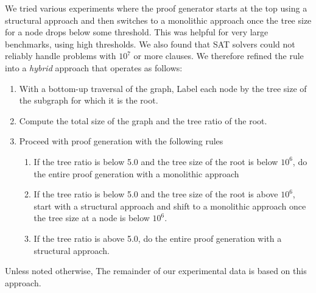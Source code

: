 \documentclass[twoside,11pt]{article}
\begin{document}
We tried various experiments where the proof generator starts at the
top using a structural approach and then switches to a monolithic
approach once the tree size for a node drops below some threshold.
This was helpful for very large benchmarks, using high thresholds.
We also found that SAT solvers could not reliably handle problems with $10^7$ or more clauses.
We therefore refined the rule into a \emph{hybrid} approach that operates as follows:
\begin{enumerate}
\item With a bottom-up traversal of the graph, Label each node by the tree size of the subgraph for which it is the root.
\item Compute the total size of the graph and the tree ratio of the root.
\item Proceed with proof generation with the following rules
  \begin{enumerate}
  \item If the tree ratio is below 5.0 and the tree size of the root is below $10^6$, do the entire proof generation with a monolithic approach
  \item If the tree ratio is below 5.0 and the tree size of the root is above $10^6$, start with a structural approach and shift to a monolithic approach once the tree size at a node is below $10^6$.
  \item If the tree ratio is above 5.0, do the entire proof generation
    with a structural approach.
  \end{enumerate}
\end{enumerate}
Unless noted otherwise, The remainder of our experimental data is based on this approach.
\end{document}

